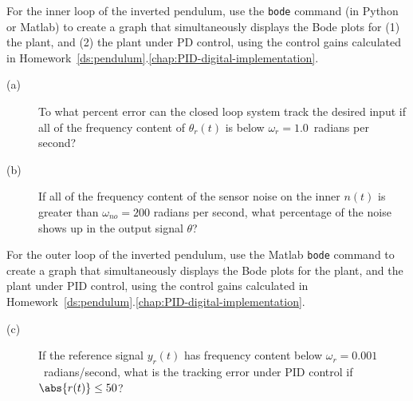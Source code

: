 
For the inner loop of the inverted pendulum, use the \texttt{bode} command (in Python or Matlab) to create a graph that simultaneously displays the Bode plots for (1) the plant, and (2) the plant under PD control, using the control gains calculated in Homework~\ref{ds:pendulum}.\ref{chap:PID-digital-implementation}.  
\begin{description}
\item[(a)]  To what percent error can the closed loop system track the desired input if all of the frequency content of $\theta_r(t)$ is below $\omega_r = 1.0$~radians per second?
\item[(b)] If all of the frequency content of the sensor noise on the inner $n(t)$ is greater than $\omega_{no} = 200$ radians per second, what percentage of the noise shows up in the output signal $\theta$?
\end{description}

For the outer loop of the inverted pendulum, use the Matlab \texttt{bode} command to create a graph that simultaneously displays the Bode plots for the plant, and the plant under PID control, using the control gains calculated in Homework~\ref{ds:pendulum}.\ref{chap:PID-digital-implementation}.  
\begin{description}
\item[(c)] If the reference signal $y_r(t)$ has frequency content below $\omega_r=0.001$~radians/second, what is the tracking error under PID control if $\abs{r(t)}\leq 50$?
\end{description}
